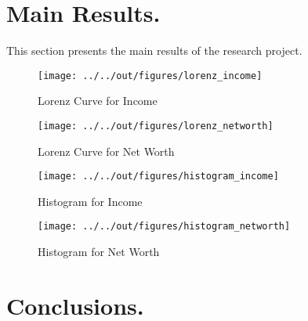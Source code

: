 \documentclass[11pt, a4paper, leqno]{article}
\begin{document}
\section{Main Results.}
\label{sec:mainresults}

This section presents the main results of the research project.
\begin{figure}
    \caption{Lorenz Curve for Income}
    
    \texttt{[image: ../../out/figures/lorenz\_income]}
    \label{fig:lorincome}
\end{figure}


\begin{figure}
    \caption{Lorenz Curve for Net Worth}
    
    \texttt{[image: ../../out/figures/lorenz\_networth]}
    \label{fig:lornetworth}

\end{figure}

\begin{figure}
    \caption{Histogram for Income}
    
    \texttt{[image: ../../out/figures/histogram\_income]}
    \label{fig:histincome}
\end{figure}

\begin{figure}
    \caption{Histogram for Net Worth}
    
    \texttt{[image: ../../out/figures/histogram\_networth]}
    \label{fig:histnetworth}
\end{figure}

\begin{table}
    \resizebox{\textwidth}{!}{}
    \label{tab:quintilesincome}
\end{table}


\begin{table}
    \resizebox{\textwidth}{!}{}
    \label{tab:quintilesnetworth}
\end{table}

\begin{table}
    \resizebox{\textwidth}{!}{}
    \label{tab:agepartition}
\end{table}

\section{Conclusions.}
\end{document}
